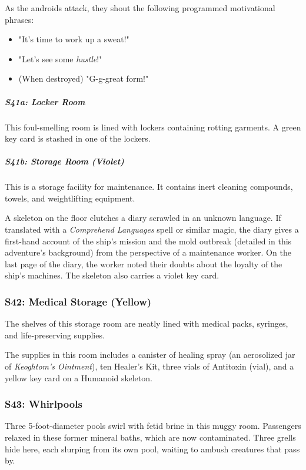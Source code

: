 \documentclass[10pt,a4paper,twoside,bg=print,twocolumn,openany,nodeprecatedcode]{dndbook}
\begin{document}
As the androids attack, they shout the following programmed motivational phrases:


\begin{itemize}
\item "It's time to work up a sweat!"
\item "Let's see some \textit{hustle}!"
\item (When destroyed) "G-g-great form!"
\end{itemize}

\subparagraph{S41a: Locker Room}
This foul-smelling room is lined with lockers containing rotting garments. A green key card is stashed in one of the lockers.

\subparagraph{S41b: Storage Room (Violet)}
This is a storage facility for maintenance. It contains inert cleaning compounds, towels, and weightlifting equipment.

A skeleton on the floor clutches a diary scrawled in an unknown language. If translated with a \textit{Comprehend Languages} spell or similar magic, the diary gives a first-hand account of the ship's mission and the mold outbreak (detailed in this adventure's background) from the perspective of a maintenance worker. On the last page of the diary, the worker noted their doubts about the loyalty of the ship's machines. The skeleton also carries a violet key card.

\subsubsection{S42: Medical Storage (Yellow)}
\begin{DndReadAloud}{}
The shelves of this storage room are neatly lined with medical packs, syringes, and life-preserving supplies.

\end{DndReadAloud}

The supplies in this room includes a canister of healing spray (an aerosolized jar of \textit{Keoghtom's Ointment}), ten Healer's Kit, three vials of Antitoxin (vial), and a yellow key card on a Humanoid skeleton.

\subsubsection{S43: Whirlpools}
Three 5-foot-diameter pools swirl with fetid brine in this muggy room. Passengers relaxed in these former mineral baths, which are now contaminated. Three grells hide here, each slurping from its own pool, waiting to ambush creatures that pass by.
\end{document}
